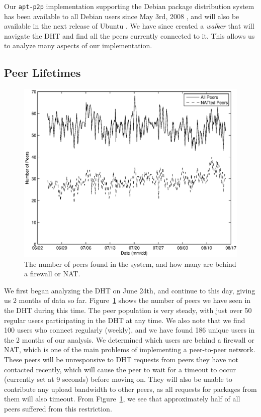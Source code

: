 \documentclass[conference]{IEEEtran}
\begin{document}
Our \texttt{apt-p2p} implementation supporting the Debian package
distribution system has been available to all Debian users since May
3rd, 2008 \cite{apt-p2p-debian}, and will also be available in the
next release of Ubuntu \cite{apt-p2p-ubuntu}. We have since created
a \emph{walker} that will navigate the DHT and find all the peers
currently connected to it. This allows us to analyze many aspects of
our implementation.

\subsection{Peer Lifetimes}
\label{peer_life}

\begin{figure}
\centering
\includegraphics[width=\columnwidth]{AptP2PWalker-peers.eps}
\caption{The number of peers found in the system, and how many are
behind a firewall or NAT.}
\label{walker_peers}
\end{figure}

We first began analyzing the DHT on June 24th, and continue to this
day, giving us 2 months of data so far. Figure~\ref{walker_peers}
shows the number of peers we have seen in the DHT during this time.
The peer population is very steady, with just over 50 regular users
participating in the DHT at any time. We also note that we find 100
users who connect regularly (weekly), and we have found 186 unique
users in the 2 months of our analysis. We determined which users are
behind a firewall or NAT, which is one of the main problems of
implementing a peer-to-peer network. These peers will be
unresponsive to DHT requests from peers they have not contacted
recently, which will cause the peer to wait for a timeout to occur
(currently set at 9 seconds) before moving on. They will also be
unable to contribute any upload bandwidth to other peers, as all
requests for packages from them will also timeout. From
Figure~\ref{walker_peers}, we see that approximately half of all
peers suffered from this restriction.
\end{document}
